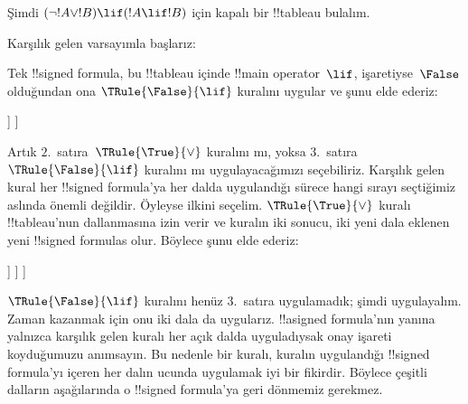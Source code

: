\begin{ex}
Şimdi $(\lnot !A \lor !B) \lif (!A \lif !B)$ için kapalı bir !!{tableau}
bulalım.

Karşılık gelen varsayımla başlarız:
\begin{oltableau}
  [\sFmla{\False}{(\lnot \formula{A} \lor \formula{B}) \lif
      (\formula{A} \lif \formula{B})}, just=\TAss]
\end{oltableau}
Tek !!{signed formula}, bu !!{tableau} içinde !!{main operator}~$\lif$,
işaretiyse~$\False$ olduğundan ona $\TRule{\False}{\lif}$ kuralını
uygular ve şunu elde ederiz:
\begin{oltableau}
  [\sFmla{\False}{(\lnot \formula{A} \lor \formula{B})
      \lif (\formula{A} \lif \formula{B})}, just=\TAss, checked
    [\sFmla{\True}{\lnot \formula{A} \lor \formula{B}},
      just={\TRule{\False}{\lif}[1]}
      [\sFmla{\False}{(\formula{A} \lif \formula{B})},
        just={\TRule{\False}{\lif}[1]}
      ]
    ]
  ]
\end{oltableau}
Artık $2$.~satıra~$\TRule{\True}{\lor}$ kuralını mı, yoksa
$3$.~satıra $\TRule{\False}{\lif}$ kuralını mı uygulayacağımızı
seçebiliriz. Karşılık gelen kural her !!{signed formula}'ya her dalda
uygulandığı sürece hangi sırayı seçtiğimiz aslında önemli değildir.
Öyleyse ilkini seçelim. $\TRule{\True}{\lor}$ kuralı !!{tableau}'nun
dallanmasına izin verir ve kuralın iki sonucu, iki yeni dala eklenen yeni
!!{signed formula}s olur. Böylece şunu elde ederiz:
\begin{oltableau}
  [\sFmla{\False}{(\lnot \formula{A} \lor \formula{B}) \lif
      (\formula{A} \lif \formula{B})}, just=\TAss, checked
    [\sFmla{\True}{\lnot \formula{A} \lor \formula{B}},
      just={\TRule{\False}{\lif}[1]}, checked
      [\sFmla{\False}{(\formula{A} \lif \formula{B})},
        just={\TRule{\False}{\lif}[1]}
        [\sFmla{\True}{\lnot \formula{A}}, just={\TRule{\True}{\lor}[2]}]
        [\sFmla{\True}{\formula{B}}, just={\TRule{\True}{\lor}[2]}]
      ]
    ]
  ]
\end{oltableau}
$\TRule{\False}{\lif}$ kuralını henüz $3$.~satıra uygulamadık; şimdi
uygulayalım. Zaman kazanmak için onu iki dala da uygularız.
!!a{signed formula}'nın yanına yalnızca karşılık gelen kuralı her açık dalda
uyguladıysak onay işareti koyduğumuzu anımsayın. Bu nedenle bir kuralı,
kuralın uygulandığı !!{signed formula}'yı içeren her dalın ucunda uygulamak
iyi bir fikirdir. Böylece çeşitli dalların aşağılarında o !!{signed
formula}'ya geri dönmemiz gerekmez.
\begin{oltableau}

\end{oltableau}
\end{ex}
